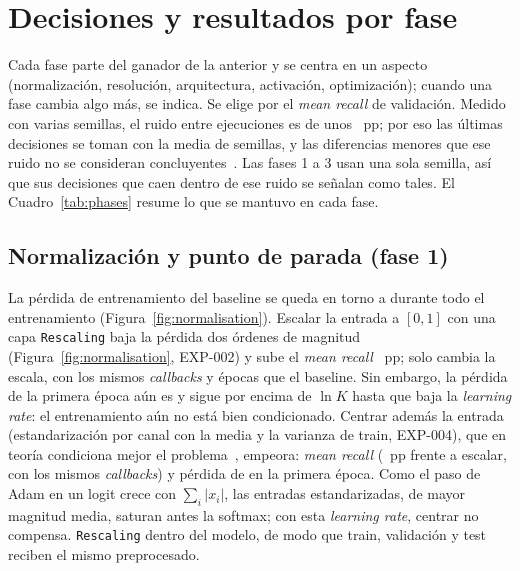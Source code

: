 \section{Decisiones y resultados por fase}
Cada fase parte del ganador de la anterior y se centra en un aspecto (normalización, resolución, arquitectura,
activación, optimización); cuando una fase cambia algo más, se indica. Se elige por el \emph{mean recall} de
validación. Medido con varias semillas, el ruido entre ejecuciones es de unos ~pp; por eso las
últimas decisiones se toman con la media de  semillas, y las diferencias menores que ese ruido no se
consideran concluyentes~\cite{bouthillier}. Las fases 1 a 3 usan una sola semilla, así que sus decisiones que caen
dentro de ese ruido se señalan como tales. El Cuadro~\ref{tab:phases} resume lo que se mantuvo en cada fase.

\begin{table}[h]
  \centering\small
  \caption{Configuración que se mantiene al final de cada fase (validación; media $\pm$ desviación típica cuando hay
  varias semillas).}
  \label{tab:phases}
\end{table}

\subsection{Normalización y punto de parada (fase 1)}
{La pérdida de entrenamiento del baseline se queda en torno a  durante todo el entrenamiento
(Figura~\ref{fig:normalisation}).}
{Escalar la entrada a $[0, 1]$ con una capa \texttt{Rescaling} baja la pérdida dos órdenes de magnitud
(Figura~\ref{fig:normalisation}, EXP-002) y sube el \emph{mean recall} ~pp; solo cambia la
escala, con los mismos \emph{callbacks} y épocas que el baseline. Sin embargo, la pérdida de la primera época aún es
 y sigue por encima de $\ln K$ hasta que baja la \emph{learning rate}: el entrenamiento aún no
está bien condicionado. Centrar además la entrada (estandarización por canal con la media y la varianza de train,
EXP-004), que en teoría condiciona mejor el problema~\cite{lecun}, empeora: \emph{mean recall}
 (~pp frente a escalar, con los mismos \emph{callbacks}) y pérdida
de  en la primera época. Como el paso de Adam en un logit crece con $\sum_i |x_i|$, las entradas
estandarizadas, de mayor magnitud media, saturan antes la softmax; con esta \emph{learning rate}, centrar no compensa.}
{\texttt{Rescaling} dentro del modelo, de modo que train, validación y test reciben el mismo preprocesado.}

